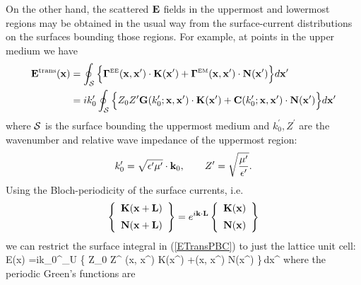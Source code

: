 \documentclass[letterpaper]{article}
\begin{document}
On the other hand, the scattered $\mathbf{E}$ fields in the uppermost
and lowermost regions may be obtained in the usual way from the
surface-current distributions on the surfaces bounding those
regions. For example, at points in the upper medium we have 
\begin{align}
 \mathbf{E}^{\hbox{\scriptsize{trans}}}(\mathbf{x})
&=\oint_{\mathcal{S}} \Big\{ 
   \boldsymbol{\Gamma}^{\hbox{\tiny{EE}}}(\mathbf{x},\mathbf{x}^\prime)\cdot \mathbf{K}(\mathbf{x}^\prime)
  +\boldsymbol{\Gamma}^{\hbox{\tiny{EM}}}(\mathbf{x},\mathbf{x}^\prime)\cdot \mathbf{N}(\mathbf{x}^\prime)
                \Big\}d\mathbf{x}^\prime
\nonumber \\
&=ik_0^\prime \oint_{\mathcal{S}} \Big\{ 
   Z_0 Z^\prime \mathbf{G}(k_0^\prime; \mathbf{x},\mathbf{x}^\prime)
                    \cdot \mathbf{K}(\mathbf{x}^\prime)
               +\mathbf{C}(k_0^\prime; \mathbf{x},\mathbf{x}^\prime)
                    \cdot \mathbf{N}(\mathbf{x}^\prime) \Big\}d\mathbf{x}^\prime
\label{ETransPBC}
\end{align}
where $\mathcal{S}$ is the surface bounding the uppermost medium and
$k_0^\prime, Z^\prime$ are the wavenumber and relative wave 
impedance of the uppermost region:
$$k_0^\prime=\sqrt{\epsilon^\prime \mu^\prime }\cdot \mathbf{k}_0,
  \qquad
  Z^\prime=\sqrt{\frac{\mu^\prime}{\epsilon^\prime}}.
$$
Using the Bloch-periodicity of the surface currents, i.e.
$$ \left\{ \begin{array}{c} 
   \mathbf{K}(\mathbf{x}+\mathbf{L}) \\[5pt] \mathbf{N}(\mathbf{x}+\mathbf{L})
   \end{array}\right\}
   =
   e^{i\mathbf{k} \cdot \mathbf{L}}
   \left\{ \begin{array}{c} 
   \mathbf{K}(\mathbf{x}) \\[5pt] \mathbf{N}(\mathbf{x})
   \end{array}\right\}
$$
we can restrict the surface integral in (\ref{ETransPBC}) to 
just the lattice unit cell:
{
 \vb E(\vb x)
=ik_0^\prime \int_{U} 
  \Big\{
  Z_0 Z^\prime 
   (\vb x, \vb x^\prime) \cdot \vb K(\vb x^\prime)
  +(\vb x, \vb x^\prime) \cdot \vb N(\vb x^\prime)
  \Big\}\,d\vb x^\prime
}
where the periodic Green's functions are
\end{document}
